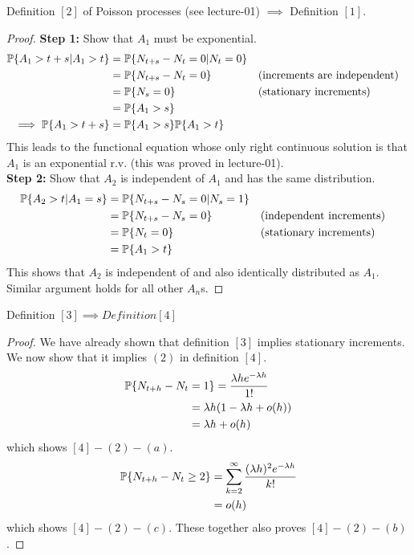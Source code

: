 \documentclass[all-lectures.tex]{subfiles}
\begin{document}
\begin{prop}[]
Definition $[2]$ of Poisson processes (see lecture-01) $\implies$ Definition $[1]$.
\begin{proof} 
\textbf{Step 1:} Show that $A_1$  must be exponential. 
\begin{align*}
\P\{A_1 > t+s|A_1>t\} &= \P\{N_{t+s}-N_t = 0|N_t = 0\} \\
 &= \P\{N_{t+s}-N_t = 0\} &&\text{(increments are independent)}\\
 &= \P\{N_s = 0\} &&\text{(stationary increments)}\\
 &= \P\{A_1 > s\} \\  
 \implies \P\{A_1 > t+s\} &=  \P\{A_1 > s\} \P\{A_1 > t\}
\end{align*}
This leads to the functional equation whose only right continuous solution is that $A_1$ is an exponential r.v. (this was proved in lecture-01).\\
\textbf{Step 2:} Show that $A_2$ is independent of $A_1$ and has the same distribution. 
\begin{align*}
\P\{A_2>t|A_1 = s\} &= \P\{N_{t+s} -N_s = 0|N_s = 1\} \\
&= \P\{N_{t+s} -N_s = 0\} && \text{(independent increments)}\\
&= \P\{N_{t} = 0\} && \text{(stationary increments)}\\
&= \P\{A_1>t\}
\end{align*}
This shows that $A_2$ is independent of and also identically distributed as $A_1$. Similar argument holds for all other $A_n$s.
\end{proof}
\end{prop}


\begin{prop}
Definition $[3] \implies Definition [4]$ 
\begin{proof}
We have already shown that definition $[3]$ implies stationary increments. We now show that it implies $(2)$ in definition $[4]$.
\begin{align*}
\P\{N_{t+h} - N_{t}  &= 1 \} = \frac{\lambda h e^{-\lambda h}}{1!} \\
&= \lambda h (1 - \lambda h + o(h)) \\
&= \lambda h + o(h)
\end{align*}
which shows $[4]-(2)-(a)$. 
\begin{align*}
\P\{N_{t+h} - N_{t}  \geq 2 \} &= \sum_{k=2}^{\infty} \frac{(\lambda h)^2 e^{-\lambda h}}{k!} \\
&= o(h)
\end{align*}
which shows $[4]-(2)-(c)$. These together also proves $[4]-(2)-(b)$.
\end{proof}
\end{prop}
\end{document}
